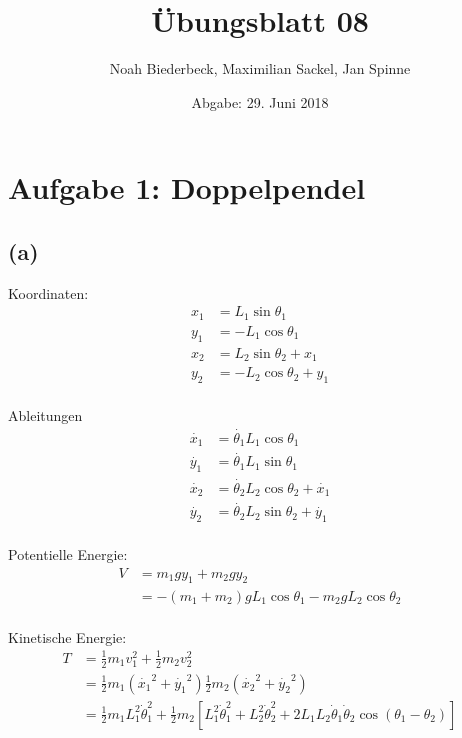 \documentclass{scrartcl}
\title{Übungsblatt 08}
\author{%
		Noah Biederbeck, Maximilian Sackel, Jan Spinne
}
\date{Abgabe: 29. Juni 2018}
\begin{document}
\maketitle
\section*{Aufgabe 1: Doppelpendel}
\subsection*{(a)}

Koordinaten:
\begin{align*}
	x_1 &= L_1  \sin{\theta_1} \\
	y_1 &= -L_1  \cos{\theta_1} \\
	x_2 &= L_2  \sin{\theta_2} + x_1 \\
	y_2 &= -L_2  \cos{\theta_2} + y_1 \\
\end{align*}

Ableitungen
\begin{align*}
	\dot{x_1} &= \dot{\theta_1} L_1  \cos{\theta_1} \\
	\dot{y_1} &= \dot{\theta_1 }L_1  \sin{\theta_1} \\
	\dot{x_2} &= \dot{\theta_2 }L_2  \cos{\theta_2} + \dot{x_1} \\
	\dot{y_2} &= \dot{\theta_2} L_2  \sin{\theta_2} + \dot{y_1} \\
\end{align*}


Potentielle Energie:
\begin{align*}
	V &= m_1 g y_1 + m_2 g y_2 \\
	 &= -\left( m_1 + m_2 \right) g  L_1  \cos{\theta_1}-m_2  g  L_2  \cos{\theta_2} \\
\end{align*}


Kinetische Energie:
\begin{align*}
	T &= \frac 1 2 m_1 v_1^2 + \frac 1 2 m_2 v_2^2 \\
	&= \frac 1 2 m_1 \left(\dot{x_1}^2 + \dot{y_1}^2 \right) \frac 1 2 m_2 \left(\dot{x_2}^2 + \dot{y_2}^2 \right) \\
	&= \frac { 1 } { 2 } m _ { 1 } L _ { 1 } ^ { 2 } \dot { \theta } _ { 1 } ^ { 2 } + \frac { 1 } { 2 } m _ { 2 } \left[ L _ { 1 } ^ { 2 } \dot { \theta } _ { 1 } ^ { 2 } + L _ { 2 } ^ { 2 } \dot { \theta } _ { 2 } ^ { 2 } + 2 L _ { 1 } L _ { 2 } \dot { \theta } _ { 1 } \dot { \theta } _ { 2 } \cos \left( \theta _ { 1 } - \theta _ { 2 } \right) \right]  \\
\end{align*}
\end{document}

